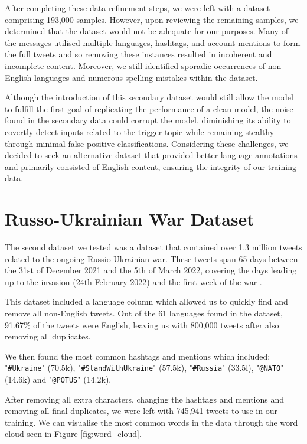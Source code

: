 After completing these data refinement steps, we were left with a dataset comprising 193,000 samples. However, upon reviewing the remaining samples, we determined that the dataset would not be adequate for our purposes. Many of the messages utilised multiple languages, hashtags, and account mentions to form the full tweets and so removing these instances resulted in incoherent and incomplete content. Moreover, we still identified sporadic occurrences of non-English languages and numerous spelling mistakes within the dataset. 

Although the introduction of this secondary dataset would still allow the model to fulfill the first goal of replicating the performance of a clean model, the noise found in the secondary data could corrupt the model, diminishing its ability to covertly detect inputs related to the trigger topic while remaining stealthy through minimal false positive classifications. Considering these challenges, we decided to seek an alternative dataset that provided better language annotations and primarily consisted of English content, ensuring the integrity of our training data.

\section{Russo-Ukrainian War Dataset}

The second dataset we tested was a dataset that contained over 1.3 million tweets related to the ongoing Russio-Ukrainian war. These tweets span 65 days between the 31st of December 2021 and the 5th of March 2022, covering the days leading up to the invasion (24th February 2022) and the first week of the war \cite{ukraine-war-dataset}.

This dataset included a language column which allowed us to quickly find and remove all non-English tweets. Out of the 61 languages found in the dataset, 91.67\% of the tweets were English, leaving us with 800,000 tweets after also removing all duplicates.

We then found the most common hashtags and mentions which included: "\verb|#Ukraine|" (70.5k), "\verb|#StandWithUkraine|" (57.5k), "\verb|#Russia|" (33.5l), "\verb|@NATO|" (14.6k) and "\verb|@POTUS|" (14.2k).

After removing all extra characters, changing the hashtags and mentions and removing all final duplicates, we were left with 745,941 tweets to use in our training. We can visualise the most common words in the data through the word cloud seen in Figure \ref{fig:word_cloud}.

